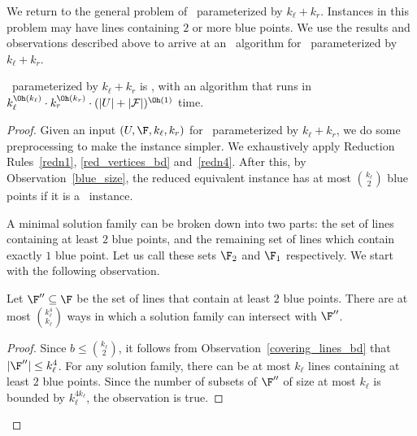 







We return to the general problem of \slrbsc\ parameterized by $k_\ell+k_r$. Instances in this problem may have lines containing $2$ or more blue points. 
We use the results and observations described above to arrive at an \FPT\ algorithm for \slrbsc\ parameterized by $k_\ell+k_r$.

\begin{theorem}
\label{thm:colour_coding}
 \slrbsc\ parameterized by $k_\ell+k_r$ is \FPT, with an algorithm that runs in $k_\ell^{\Oh(k_\ell)}\cdot 
 k_r^{\Oh(k_r)} \cdot (\vert U \vert + \vert {\cal F} \vert)^{\Oh(1)}$ time.
\end{theorem}
\begin{proof}
Given an input $(U,\F , k_\ell ,k_r)$ for \slrbsc\ parameterized by $k_\ell+k_r$, we do some preprocessing to make the instance simpler. We exhaustively apply Reduction Rules~\ref{redn1}, \ref{red_vertices_bd} and~\ref{redn4}. After this, by Observation~\ref{blue_size}, the reduced equivalent instance has at most $k_\ell \choose 2$ blue points  if it is a \YES\ instance.

A minimal solution family can be broken down into two parts:  the set of lines containing at least $2$ blue points, and the remaining set of lines which contain exactly $1$ blue point.  Let us call these sets $\F_2$ and $\F_1$ respectively. We start with the following observation. 

\begin{observation}\label{2blue_lines}
 Let $\F'' \subseteq \F$ be the set of lines that contain at least $2$ blue points. There are at most $k_\ell^{4} \choose k_\ell$ ways in which a solution family can intersect with $\F''$.
\end{observation}
\begin{proof}
 Since $b \leq {k_\ell \choose 2}$, it follows from Observation~\ref{covering_lines_bd} that $\vert \F''\vert \leq k_\ell^4$. For any solution family, there can be at most $k_\ell$ lines containing at least $2$ blue points. Since the number of subsets of $\F''$ of size at most $k_\ell$ is bounded by $k_\ell^{4k_\ell}$, the observation is true.
\end{proof}


\end{proof}
